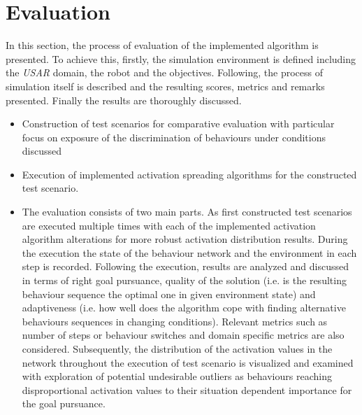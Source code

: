 \chapter{Evaluation}

\begin{comment}
Länge: ca 1-5 Seiten\\\\
Sind die gesteckten Ziele zur Problemlösung durch die Implementierung erreicht worden? Was kann die vorgestellte Lösung, was kann sie nicht. Des Weiteren gehören zu einer Implementierung auch immer Tests, ob die Implementierung erfolgreich war! Diese Tests/Versuche müssen auch dokumentiert werden. In diesem Kapitel sollte daher eine Beschreibung des Aufbaus und der Ergebnisse von Testläufen/Simulationen vorhanden sein. Ebenso sollte eine Interpretation der Ergebnisse die Tests abschließen. Es ist auch wichtig, nicht nur positive, sondern auch negative Ergebnisse zu dokumentieren und zu interpretieren.

Hier sollte auch ein Bezug zu ggf. aufgestellten Forschungsfragen gefunden werden.
\end{comment}

In this section, the process of evaluation of the implemented algorithm is presented. To achieve this, firstly, the simulation environment is defined including the \textit{USAR} domain, the robot and the objectives. Following, the process of simulation itself is described and the resulting scores, metrics and remarks presented. Finally the results are thoroughly discussed.

\begin{itemize}
    \item Construction of test scenarios for comparative evaluation with particular focus on exposure of the discrimination of behaviours under conditions discussed
    \item Execution of implemented activation spreading algorithms for the constructed test scenario.
    \item The evaluation consists of two main parts. As first constructed test scenarios are executed multiple times with each of the implemented activation algorithm alterations for more robust activation distribution results. During the execution the state of the behaviour network and the environment in each step is recorded. Following the execution, results are analyzed and discussed in terms of right goal pursuance, quality of the solution (i.e. is the resulting behaviour sequence the optimal one in given environment state) and adaptiveness (i.e. how well does the algorithm cope with finding alternative behaviours sequences in changing conditions). Relevant metrics such as number of steps or behaviour switches and domain specific metrics are also considered. Subsequently, the distribution of the activation values in the network throughout the execution of test scenario is visualized and examined with exploration of potential undesirable outliers as behaviours reaching disproportional activation values to their situation dependent importance for the goal pursuance.
\end{itemize}
